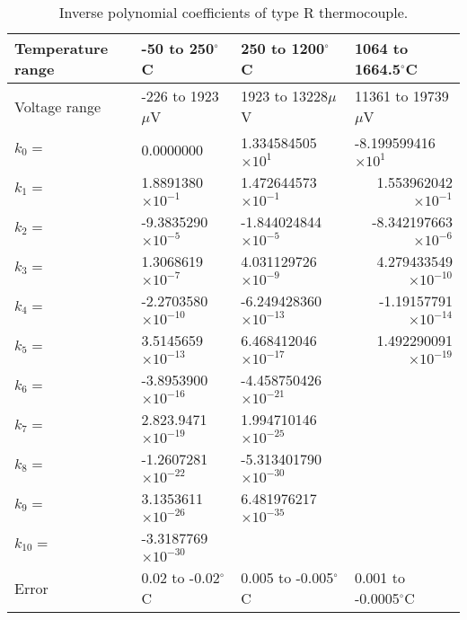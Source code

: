 \begin{table}[htbp]
  \centering
  \small
  \caption{Inverse polynomial coefficients of type R thermocouple.}
    \begin{tabular}{lllr}
    \toprule
    Temperature range & -50 to 250$^{\circ}$C & 250 to 1200$^{\circ}$C & \multicolumn{1}{l}{1064 to 1664.5$^{\circ}$C} \\
    \midrule
    Voltage range & -226 to 1923$\mu$V & 1923 to 13228$\mu$V & \multicolumn{1}{l}{11361 to 19739$\mu$V} \\
    \midrule
    $k_{0}=$ & 0.0000000 & 1.334584505$\times 10^{1}$ & \multicolumn{1}{l}{-8.199599416$\times 10^{1}$} \\
    $k_{1}=$ & 1.8891380$\times 10^{-1}$ & 1.472644573$\times 10^{-1}$ & 1.553962042$\times 10^{-1}$ \\
    $k_{2}=$ & -9.3835290$\times 10^{-5}$ & -1.844024844$\times 10^{-5}$ & -8.342197663$\times 10^{-6}$ \\
    $k_{3}=$ & 1.3068619$\times 10^{-7}$ & 4.031129726$\times 10^{-9}$ & 4.279433549$\times 10^{-10}$ \\
    $k_{4}=$ & -2.2703580$\times 10^{-10}$ & -6.249428360$\times 10^{-13}$ & -1.19157791$\times 10^{-14}$ \\
    $k_{5}=$ & 3.5145659$\times 10^{-13}$ & 6.468412046$\times 10^{-17}$ & 1.492290091$\times 10^{-19}$ \\
    $k_{6}=$ & -3.8953900$\times 10^{-16}$ & -4.458750426$\times 10^{-21}$ & \multicolumn{1}{l}{} \\
    $k_{7}=$ & 2.823.9471$\times 10^{-19}$ & 1.994710146$\times 10^{-25}$ & \multicolumn{1}{l}{} \\
    $k_{8}=$ & -1.2607281$\times 10^{-22}$ & -5.313401790$\times 10^{-30}$ & \multicolumn{1}{l}{} \\
    $k_{9}=$ & 3.1353611$\times 10^{-26}$ & 6.481976217$\times 10^{-35}$ & \multicolumn{1}{l}{} \\
    $k_{10}=$ & -3.3187769$\times 10^{-30}$ &       & \multicolumn{1}{l}{} \\
    \midrule
    Error & 0.02 to -0.02$^{\circ}$C & 0.005 to -0.005$^{\circ}$C & \multicolumn{1}{l}{0.001 to -0.0005$^{\circ}$C} \\
    \bottomrule
    \end{tabular}%
  \label{tab:TypeRInversePolynomial}%
\end{table}%


